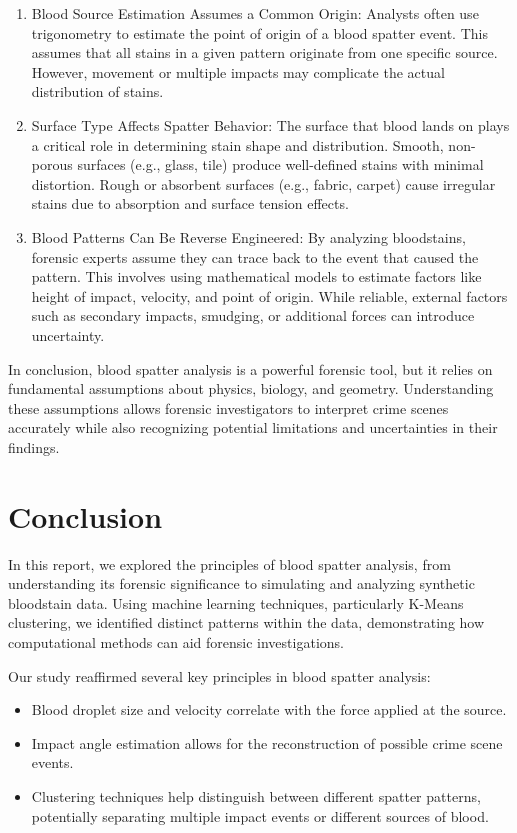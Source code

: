 \documentclass[11pt]{article}
\providecommand{\tightlist}{%
      \setlength{\itemsep}{0pt}\setlength{\parskip}{0pt}}
\begin{document}
\begin{enumerate}
\def\labelenumi{\arabic{enumi}.}
\setcounter{enumi}{4}
\item
  Blood Source Estimation Assumes a Common Origin: Analysts often use
  trigonometry to estimate the point of origin of a blood spatter event.
  This assumes that all stains in a given pattern originate from one
  specific source. However, movement or multiple impacts may complicate
  the actual distribution of stains.
\item
  Surface Type Affects Spatter Behavior: The surface that blood lands on
  plays a critical role in determining stain shape and distribution.
  Smooth, non-porous surfaces (e.g., glass, tile) produce well-defined
  stains with minimal distortion. Rough or absorbent surfaces (e.g.,
  fabric, carpet) cause irregular stains due to absorption and surface
  tension effects.
\item
  Blood Patterns Can Be Reverse Engineered: By analyzing bloodstains,
  forensic experts assume they can trace back to the event that caused
  the pattern. This involves using mathematical models to estimate
  factors like height of impact, velocity, and point of origin. While
  reliable, external factors such as secondary impacts, smudging, or
  additional forces can introduce uncertainty.
\end{enumerate}

In conclusion, blood spatter analysis is a powerful forensic tool, but
it relies on fundamental assumptions about physics, biology, and
geometry. Understanding these assumptions allows forensic investigators
to interpret crime scenes accurately while also recognizing potential
limitations and uncertainties in their findings.

    \section{Conclusion}\label{conclusion}

In this report, we explored the principles of blood spatter analysis,
from understanding its forensic significance to simulating and analyzing
synthetic bloodstain data. Using machine learning techniques,
particularly K-Means clustering, we identified distinct patterns within
the data, demonstrating how computational methods can aid forensic
investigations.

Our study reaffirmed several key principles in blood spatter analysis:

\begin{itemize}
\tightlist
\item
  Blood droplet size and velocity correlate with the force applied at
  the source.
\item
  Impact angle estimation allows for the reconstruction of possible
  crime scene events.
\item
  Clustering techniques help distinguish between different spatter
  patterns, potentially separating multiple impact events or different
  sources of blood.
\end{itemize}
\end{document}
